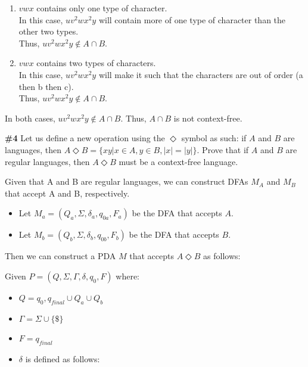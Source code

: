 \documentclass{article}
\newcommand{\problem}[1]{\textbf{\##1}}
\newcommand{\union}{\cup}
\begin{document}
\begin{itemize}
    \begin{enumerate}
        \item $vwx$ contains only one type of character.\\
        In this case, $uv^2wx^2y$ will contain more of one type of character than the other two types.\\
        Thus, $uv^2wx^2y \notin A \cap B$.
        \item $vwx$ contains two types of characters.\\
        In this case, $uv^2wx^2y$ will make it such that the characters are out of order (a then b then c).\\
        Thus, $uv^2wx^2y \notin A \cap B$.
    \end{enumerate}

    In both cases, $uv^2wx^2y \notin A \cap B$. Thus, $A \cap B$ is not context-free.

\end{itemize}

\pagebreak

\problem{4}
Let us define a new operation using the $\Diamond$ symbol as such: if $A$ and $B$ are languages, then $A \Diamond B = \{xy | x \in A, y \in B, |x|=|y| \}$. Prove that if $A$ and $B$ are regular languages, then $A \Diamond B$ must be a context-free language.

Given that A and B are regular languages, we can construct DFAs $M_A$ and $M_B$ that accept A and B, respectively.\\
\begin{itemize}
    \item Let $M_a = (Q_a, \Sigma, \delta_a, q_{0a}, F_a)$ be the DFA that accepts $A$.
    \item Let $M_b = (Q_b, \Sigma, \delta_b, q_{0b}, F_b)$ be the DFA that accepts $B$.
\end{itemize}

Then we can construct a PDA $M$ that accepts $A \Diamond B$ as follows:

Given $P = (Q, \Sigma, \Gamma, \delta, q_0, F)$ where:

\begin{itemize}
    \item $Q = {q_0, q_{final}} \union Q_a \union Q_b$
    \item $\Gamma = \Sigma \union \{\$\}$
    \item $F = {q_{final}}$
    \item $\delta$ is defined as follows:
\end{itemize}
\end{document}
